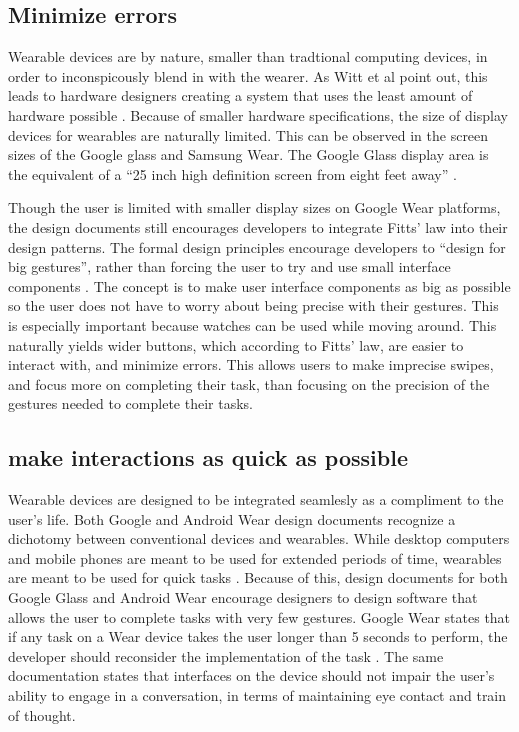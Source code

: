 \documentclass[12pt]{article}
\begin{document}
\subsection{Minimize errors}
Wearable devices are by nature, smaller than tradtional computing devices, in order to inconspicously blend in with the wearer. As Witt et al point out, this leads to hardware designers creating a system that uses the least amount of hardware possible \cite{witt}. Because of smaller hardware specifications, the size of display devices for wearables are naturally limited. This can be observed in the screen sizes of the Google glass and Samsung Wear. The Google Glass display area is the equivalent of a ``25 inch high definition screen from eight feet away'' \cite{goog2}.

Though the user is limited with smaller display sizes on Google Wear platforms, the design documents still encourages developers to integrate Fitts' law into their design patterns. The formal design principles encourage developers to ``design for big gestures'', rather than forcing the user to try and use small interface components \cite{andr}. The concept is to make user interface components as big as possible so the user does not have to worry about being precise with their gestures. This is especially important because watches can be used while moving around. This naturally yields wider buttons, which according to Fitts' law, are easier to interact with, and minimize errors. This allows users to make imprecise swipes, and focus more on completing their task, than focusing on the precision of the gestures needed to complete their tasks.

\subsection{make interactions as quick as possible}
Wearable devices are designed to be integrated seamlesly as a compliment to the user's life. Both Google and Android Wear design documents recognize a dichotomy between conventional devices and wearables. While desktop computers and mobile phones are meant to be used for extended periods of time, wearables are meant to be used for quick tasks \cite{andr}. Because of this, design documents for both Google Glass and Android Wear encourage designers to design software that allows the user to complete tasks with very few gestures. Google Wear states that if any task on a Wear device takes the user longer than 5 seconds to perform, the developer should reconsider the implementation of the task \cite{andr}. The same documentation states that interfaces on the device should not impair the user's ability to engage in a conversation, in terms of maintaining eye contact and train of thought. 
\end{document}
